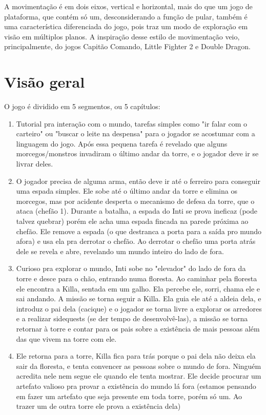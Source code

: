 \documentclass[12pt]{article}
\begin{document}
A movimentação é em dois eixos, vertical e horizontal, mais do que um jogo de
plataforma, que contém só um, desconsiderando a função de pular, também é uma
característica diferenciada do jogo, pois traz um modo de exploração em visão
em múltiplos planos. A inspiração desse estilo de movimentação veio,
principalmente, do jogos Capitão Comando, Little Fighter 2 e Double Dragon.

\section{Visão geral}
O jogo é dividido em 5 segmentos, ou 5 capítulos:
\begin{enumerate}
\item Tutorial pra interação com o mundo, tarefas simples como "ir falar com o carteiro" ou "buscar o leite na despensa" para o jogador se acostumar com a linguagem do jogo.
Após essa pequena tarefa é revelado que alguns morcegos/monstros invadiram o último andar da torre, e o jogador deve ir se livrar deles.
\item O jogador precisa de alguma arma, então deve ir até o ferreiro para conseguir uma espada simples. Ele sobe até o último andar da torre e elimina os morcegos, mas por acidente desperta o mecanismo de defesa da torre, que o ataca (chefão 1).
Durante a batalha, a espada do Inti se prova ineficaz (pode talvez quebrar) porém ele acha uma espada fincada na parede próxima ao chefão. Ele remove a espada (o que destranca a porta para a saída pro mundo afora) e usa ela pra derrotar o chefão.
Ao derrotar o chefão uma porta atrás dele se revela e abre, revelando um mundo inteiro do lado de fora.
\item Curioso pra explorar o mundo, Inti sobe no "elevador" do lado de fora da torre e desce para o chão, entrando numa floresta.
Ao caminhar pela floresta ele encontra a Killa, sentada em um galho. Ela percebe ele, sorri, chama ele e sai andando. A missão se torna seguir a Killa.
Ela guia ele até a aldeia dela, e introduz o pai dela (cacique) e o jogador se torna livre a explorar os arredores e a realizar sidequests (se der tempo de desenvolvê-las), a missão se torna retornar à torre e contar para os pais sobre a existência de mais pessoas além das que vivem na torre com ele.
\item Ele retorna para a torre, Killa fica para trás porque o pai dela não deixa ela sair da floresta, e tenta convencer as pessoas sobre o mundo de fora. Ninguém acredita nele nem segue ele quando ele tenta mostrar. Ele decide procurar um artefato valioso pra provar a existência do mundo lá fora (estamos pensando em fazer um artefato que seja presente em toda torre, porém só um. Ao trazer um de outra torre ele prova a existência dela)

\end{enumerate}
\end{document}
